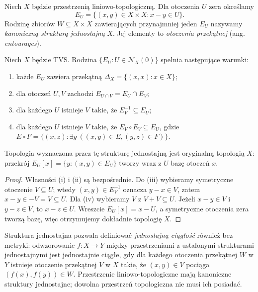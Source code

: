 \begin{definicja}
Niech $X$ będzie przestrzenią liniowo-topologiczną. Dla otoczenia
$U$ zera określamy
\[
 E_U=\{(x,y)\in X\times X:x-y\in U\}.
\]
Rodzinę zbiorów $W\subseteq X\times X$ zawierających przynajmniej
jeden $E_U$ nazywamy \emph{kanoniczną strukturą jednostajną} $X$.
Jej elementy to \emph{otoczenia przekątnej} (ang. \emph{entourages}).
\end{definicja}

\begin{twierdzenie}
\label{thm:uniform-tvs}
Niech $X$ będzie TVS. Rodzina $\{E_U:U\in\mathcal N_X(0)\}$
spełnia następujące warunki:
\begin{enumerate}[label=\textup{(\roman*)}]
\item każde $E_U$ zawiera przekątną $\Delta_X=\{(x,x):x\in X\}$;
\item dla otoczeń $U,V$ zachodzi $E_{U\cap V}=E_U\cap E_V$;
\item dla każdego $U$ istnieje $V$ takie, że $E_V^{-1}\subseteq E_U$;
\item dla każdego $U$ istnieje $V$ takie, że
      $E_V\circ E_V\subseteq E_U$, gdzie
      $E\circ F=\{(x,z):\exists y\ ((x,y)\in E,(y,z)\in F)\}$.
\end{enumerate}
Topologia wyznaczona przez tę strukturę jednostajną jest oryginalną
topologią $X$: przekrój $E_U[x]=\{y:(x,y)\in E_U\}$
tworzy wraz z $U$ bazę otoczeń $x$.
\end{twierdzenie}
\begin{proof}
Własności (i) i (ii) są bezpośrednie. Do (iii) wybieramy symetryczne
otoczenie $V\subseteq U$; wtedy $(x,y)\in E_V^{-1}$ oznacza
$y-x\in V$, zatem $x-y\in-V=V\subseteq U$.
Dla (iv) wybieramy $V$ z $V+V\subseteq U$. Jeżeli
$x-y\in V$ i $y-z\in V$, to $x-z\in U$.
Wreszcie $E_U[x]=x-U$, a symetryczne otoczenia zera tworzą bazę,
więc otrzymujemy dokładnie topologię $X$.
\end{proof}

\begin{uwaga}
Struktura jednostajna pozwala definiować \emph{jednostajną
ciągłość} również bez metryki: odwzorowanie $f:X\to Y$
między przestrzeniami z ustalonymi strukturami jednostajnymi
jest jednostajnie ciągłe, gdy dla każdego otoczenia przekątnej
$W$ w $Y$ istnieje otoczenie przekątnej $V$ w $X$ takie,
że $(x,y)\in V$ pociąga $(f(x),f(y))\in W$.
Przestrzenie liniowo-topologiczne mają kanoniczne struktury
jednostajne; dowolna przestrzeń topologiczna nie musi ich posiadać.
\end{uwaga}


